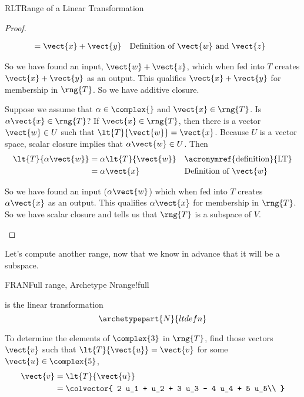 \begin{subsect}{RLT}{Range of a Linear Transformation}
\begin{proof}
\begin{para}
\begin{align*}
&=\vect{x}+\vect{y}&&\text{Definition of $\vect{w}$ and $\vect{z}$}
\end{align*}
\end{para}
%
\begin{para}So we have found an input, $\vect{w}+\vect{z}$, which when fed into $T$ creates $\vect{x}+\vect{y}$ as an output.  This qualifies $\vect{x}+\vect{y}$ for membership in $\rng{T}$.  So we have additive closure.\end{para}
%
\begin{para}Suppose we assume that $\alpha\in\complex{\null}$ and $\vect{x}\in\rng{T}$.  Is $\alpha\vect{x}\in\rng{T}$?  If $\vect{x}\in\rng{T}$, then there is a vector $\vect{w}\in U$ such that $\lt{T}{\vect{w}}=\vect{x}$.  Because $U$ is a vector space, scalar closure implies that $\alpha\vect{w}\in U$.  Then
%
\begin{align*}
\lt{T}{\alpha\vect{w}}&=\alpha\lt{T}{\vect{w}}&&\text{\acronymref{definition}{LT}}\\
&=\alpha\vect{x}&&\text{Definition of $\vect{w}$}
\end{align*}
\end{para}
%
\begin{para}So we have found an input ($\alpha\vect{w}$) which when fed into $T$ creates $\alpha\vect{x}$ as an output.  This qualifies $\alpha\vect{x}$ for membership in $\rng{T}$.  So we have scalar closure and  tells us that $\rng{T}$ is a subspace of $V$.\end{para}
%
\end{proof}
%
\begin{para}Let's compute another range, now that we know in advance that it will be a subspace.\end{para}
%
\begin{example}{FRAN}{Full range, Archetype N}{range!full}
\begin{para} is the linear transformation
%
\begin{equation*}
\archetypepart{N}{ltdefn}\end{equation*}
\end{para}
%
\begin{para}To determine the elements of $\complex{3}$ in $\rng{T}$, find those vectors $\vect{v}$ such that $\lt{T}{\vect{u}}=\vect{v}$ for some $\vect{u}\in\complex{5}$,
%
\begin{align*}
\vect{v}&=\lt{T}{\vect{u}}\\
&=
\colvector{
2 u_1 + u_2 + 3 u_3 - 4 u_4 + 5 u_5\\
}
\end{align*}
\end{para}
\end{example}
\end{subsect}
